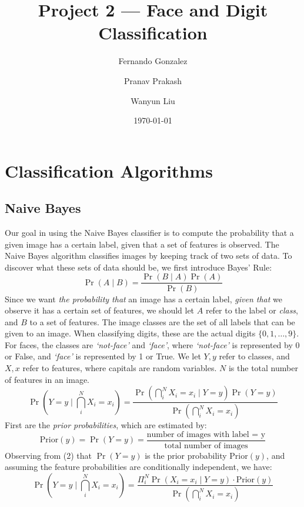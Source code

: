 \documentclass{article}
\title{Project 2 --- Face and Digit Classification}
\author{Fernando Gonzalez}
\author{Pranav Prakash}
\author{Wanyun Liu}
\affil{\textit {\{fdg17, pp618, wl432\}@scarletmail.rutgers.edu}}
\date{\today}
\begin{document}
  \maketitle
  \section{Classification Algorithms}
  \subsection{Naive Bayes}
  Our goal in using the Naive Bayes classifier is to compute the probability that a given image has a certain label,
  given that a set of features is observed. 
  The Naive Bayes algorithm classifies images by keeping track of two sets of data.
  To discover what these sets of data should be, we first introduce Bayes' Rule:
  \begin{equation}
  \Pr(A \mid B) = \frac{\Pr(B \mid A)\Pr(A)}{\Pr(B)}
  \end{equation}
  Since we want {\em the probability that} an image has a certain label, {\em given that} we observe it has a certain set of features,
  we should let $A$ refer to the label or {\em class}, and $B$ to a set of features. 
  The image classes are the set of all labels that can be given to an image.
  When classifying digits, these are the actual digits $\{0, 1, \ldots, 9\}$.
  For faces, the classes are {\em `not-face'} and {\em `face'},
  where {\em `not-face'} is represented by 0 or False, and {\em `face'} is represented by 1 or True.
  We let $Y, y$ refer to classes, and $X, x$ refer to features, where capitals are random variables. $N$ is the total number of features in an image.
  \begin{equation}
  \Pr(Y = y \mid \bigcap_i^NX_i = x_i) = \frac{\Pr(\bigcap_i^NX_i = x_i \mid Y = y)\Pr(Y = y)}{\Pr(\bigcap_i^NX_i = x_i)}
  \end{equation}
  First are the {\em prior probabilities}, which are estimated by:
  \begin{equation}
  \text{Prior}(y) = \Pr(Y = y) = \frac{\text{number of images with label = y}}{\text{total number of images}}
  \end{equation}
  Observing from (2) that $\Pr(Y = y)$ is the prior probability $\text{Prior}(y)$, and assuming the feature probabilities are conditionally independent, we have:
  \begin{equation}
  \Pr(Y = y \mid \bigcap_i^NX_i = x_i) = \frac{\Pi_i^N\Pr(X_i = x_i \mid Y = y) \cdot \text{Prior}(y)}{\Pr(\bigcap_i^NX_i = x_i)}
  \end{equation}
\end{document}
